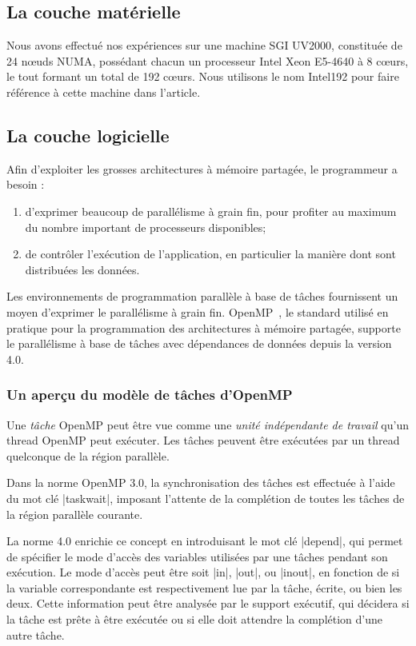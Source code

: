 \documentclass[parallelisme]{compas2016}
\begin{document}
\label{sec:background}
\subsection{La couche matérielle}
\label{sec:hardware}

Nous avons effectué nos expériences sur une machine SGI UV2000, constituée de
24 nœuds NUMA, possédant chacun un processeur Intel Xeon E5-4640 à 8 cœurs,
le tout formant un total de 192 cœurs. Nous utilisons le nom Intel192 pour faire
référence à cette machine dans l'article.

\subsection{La couche logicielle}

Afin d'exploiter les grosses architectures à mémoire partagée, le programmeur a besoin :
\begin{enumerate}
    \item d'exprimer beaucoup de parallélisme à grain fin, pour profiter au maximum du nombre
      important de processeurs disponibles;
    \item de contrôler l'exécution de l'application, en particulier la manière dont sont distribuées
      les données.
\end{enumerate}

Les environnements de programmation parallèle à base de tâches fournissent un moyen
d'exprimer le parallélisme à grain fin. OpenMP~\cite{openmp40}, le standard utilisé
en pratique pour la programmation des architectures à mémoire partagée, supporte
le parallélisme à base de tâches avec dépendances de données depuis la version 4.0.

\subsubsection{Un aperçu du modèle de tâches d'OpenMP}

Une \emph{tâche} OpenMP peut être vue comme une \emph{unité indépendante de travail} qu'un thread
OpenMP peut exécuter. Les tâches peuvent être exécutées par un thread quelconque
de la région parallèle.

Dans la norme OpenMP 3.0, la synchronisation des tâches est effectuée à l'aide du
mot clé |taskwait|, imposant l'attente de la complétion de toutes les tâches
de la région parallèle courante.

La norme 4.0 enrichie ce concept en introduisant le mot clé |depend|, qui permet
de spécifier le mode d'accès des variables utilisées par une tâches pendant son exécution.
Le mode d'accès peut être soit |in|, |out|, ou |inout|, en fonction de si la
variable correspondante est respectivement lue par la tâche, écrite, ou bien les deux.
Cette information peut être analysée par le support exécutif, qui décidera si
la tâche est prête à être exécutée ou si elle doit attendre la complétion d'une
autre tâche.
\end{document}
